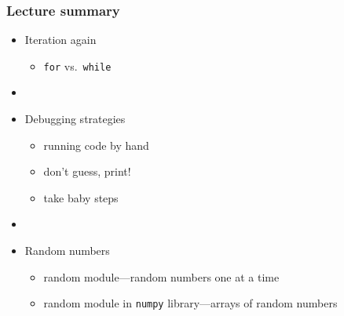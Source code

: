 \documentclass[14pt]{beamer}
\begin{document}

\begin{frame}[fragile]

\frametitle{Lecture summary}
\begin{itemize}
	\item Iteration again
	\begin{itemize}
		\item \texttt{for} vs.~\texttt{while}
	\end{itemize}

	\item[]
	
	\item Debugging strategies
	\begin{itemize}
		\item running code by hand
		\item don't guess, print!
		\item take baby steps
	\end{itemize}

	\item[]
	
	\item Random numbers
		\begin{itemize}
			\item random module---random numbers one at a time %
			\item random module in \texttt{numpy} library---arrays of random numbers %
		\end{itemize}
		
\end{itemize}

\end{frame}
\end{document}
